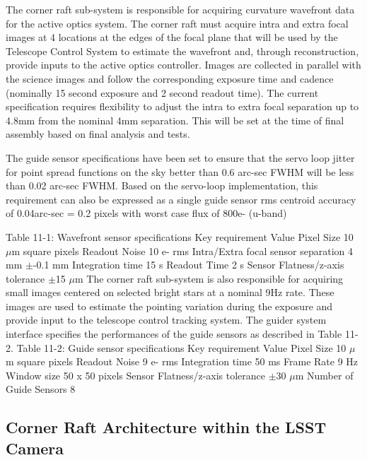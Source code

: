 The corner raft sub-system is responsible for acquiring curvature wavefront data for the active optics
system. The corner raft must acquire intra and extra focal images at 4 locations at the edges of the focal
plane that will be used by the Telescope Control System to estimate the wavefront and, through
reconstruction, provide inputs to the active optics controller. Images are collected in parallel with the
science images and follow the corresponding exposure time and cadence (nominally 15 second exposure
and 2 second readout time). The current specification requires flexibility to adjust the intra to extra focal
separation up to 4.8mm from the nominal 4mm separation. This will be set at the time of final assembly
based on final analysis and tests.

The guide sensor specifications have been set to ensure that the servo loop jitter for point spread
functions on the sky better than 0.6 arc-sec FWHM will be less than 0.02 arc-sec FWHM. Based on the
servo-loop implementation, this requirement can also be expressed as a single guide sensor rms
centroid accuracy of 0.04arc-sec = 0.2 pixels with worst case flux of 800e- (u-band)

Table 11-1: Wavefront sensor specifications
Key requirement Value
Pixel Size 10 $\mu$m square pixels
Readout Noise 10 e- rms
Intra/Extra focal sensor separation 4 mm $\pm$-0.1 mm
Integration time 15 s
Readout Time 2 s
Sensor Flatness/z-axis tolerance $\pm$15 $\mu$m
The corner raft sub-system is also responsible for acquiring small images centered on selected bright
stars at a nominal 9Hz rate. These images are used to estimate the pointing variation during the
exposure and provide input to the telescope control tracking system. The guider system interface
specifies the performances of the guide sensors as described in Table 11-2.
Table 11-2: Guide sensor specifications
Key requirement Value
Pixel Size 10 $\mu$m square pixels
Readout Noise 9 e- rms
Integration time 50 ms
Frame Rate 9 Hz
Window size 50 x 50 pixels
Sensor Flatness/z-axis tolerance $\pm$30 $\mu$m
Number of Guide Sensors 8

\subsection{Corner Raft Architecture within the LSST Camera}

